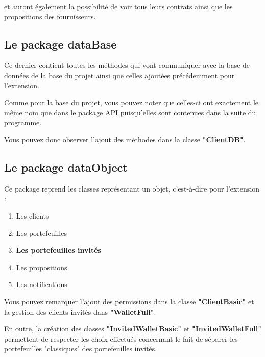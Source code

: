 \begin{flushleft}
et auront également la possibilité de voir tous leurs contrats ainsi que les propositions des fournisseurs.
\end{flushleft}

\newpage
\subsection{Le package dataBase}
\begin{flushleft}
Ce dernier contient toutes les méthodes qui vont communiquer avec la base de données de la base du projet ainsi que celles ajoutées précédemment pour l'extension.
\end{flushleft}

\begin{flushleft}
Comme pour la  base du projet, vous pouvez noter que celles-ci ont exactement le même nom que dans le package API puisqu'elles sont contenues dans la suite du programme.
\end{flushleft}

\begin{flushleft}
Vous pouvez donc observer l'ajout des méthodes dans la classe \textbf{"ClientDB"}.
\end{flushleft}

\subsection{Le package dataObject}
\begin{flushleft}
Ce package reprend les classes représentant un objet, c'est-à-dire pour l'extension :
\end{flushleft}
\begin{enumerate}
\item Les clients
\item Les portefeuilles
\item \textbf{Les portefeuilles invités}
\item Les propositions
\item Les notifications
\end{enumerate}

\begin{flushleft}
Vous pouvez remarquer l'ajout des permissions dans la classe \textbf{"ClientBasic"} et la gestion des clients invités dans \textbf{"WalletFull"}.
\end{flushleft}

\begin{flushleft}
En outre, la création des classes \textbf{"InvitedWalletBasic"} et \textbf{"InvitedWalletFull"} permettent de respecter les choix effectués concernant le fait de séparer les portefeuilles "classiques" des portefeuilles invités.
\end{flushleft}

